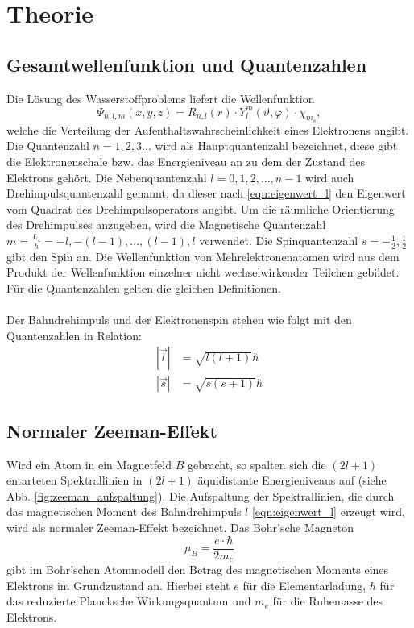 \section{Theorie}
\label{sec:Theorie}

\subsection{Gesamtwellenfunktion und Quantenzahlen}
Die Lösung des Wasserstoffproblems liefert die Wellenfunktion
\begin{equation*}
    \Psi_{n, l, m} (x, y, z) = R_{n, l}(r) \cdot Y_l^m (\vartheta, \varphi) \cdot \chi_{m_s},
\end{equation*}
welche die Verteilung der Aufenthaltswahrscheinlichkeit eines Elektronens angibt.\\
Die Quantenzahl $n = 1, 2, 3 ...$ wird als Hauptquantenzahl bezeichnet, diese gibt die Elektronenschale bzw. das Energieniveau an zu dem der Zustand des Elektrons gehört.
Die Nebenquantenzahl $l = 0, 1, 2, ..., n-1 $ wird auch Drehimpulsquantenzahl genannt, da dieser nach \autoref{eqn:eigenwert_l} den Eigenwert vom Quadrat des Drehimpulsoperators angibt. 
Um die räumliche Orientierung des Drehimpulses anzugeben, wird die Magnetische Quantenzahl $m = \frac{L_z}{\hbar} = -l, - (l-1), ..., (l-1), l$ verwendet.
Die Spinquantenzahl $s = -\frac{1}{2} , \frac{1}{2}$ gibt den Spin an.
Die Wellenfunktion von Mehrelektronenatomen wird aus dem Produkt der Wellenfunktion einzelner nicht wechselwirkender Teilchen gebildet.
Für die Quantenzahlen gelten die gleichen Definitionen.
\\ \\
Der Bahndrehimpuls und der Elektronenspin stehen wie folgt mit den Quantenzahlen in Relation:
\begin{align}
    |\vec{l}| &= \sqrt{l(l+1)} \hbar \label{eqn:eigenwert_l} \\
    |\vec{s}| &= \sqrt{s(s+1)} \hbar \label{eqn:eigenwert_s}
\end{align}
\FloatBarrier

\subsection{Normaler Zeeman-Effekt}
Wird ein Atom in ein Magnetfeld $B$ gebracht, so spalten sich die $(2l + 1)$ entarteten Spektrallinien in $(2l + 1)$ äquidistante Energieniveaus auf (siehe Abb. \ref{fig:zeeman_aufspaltung}).
Die Aufspaltung der Spektrallinien, die durch das magnetischen Moment des Bahndrehimpuls $l$ \eqref{eqn:eigenwert_l} erzeugt wird, wird als normaler Zeeman-Effekt bezeichnet.
Das Bohr'sche Magneton
\begin{equation}
    \mu_B = \frac{e \cdot \hbar}{2 m_e}
    \label{eqn:magneton}
\end{equation}
gibt im Bohr'schen Atommodell den Betrag des magnetischen Moments eines Elektrons im Grundzustand an.
Hierbei steht $e$ für die Elementarladung, $\hbar$ für das reduzierte Plancksche Wirkungsquantum und $m_e$ für die Ruhemasse des Elektrons.

